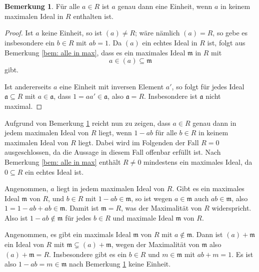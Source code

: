 \documentclass[a4paper,10pt]{article}
\newcounter{satze}
\theoremstyle{definition}
\newtheorem{bem}[satze]{Bemerkung}
\newcommand{\mf}[1]{\mathfrak{#1}}
\begin{document}
\section{}

\begin{bem}\label{bem: einheiten und maximale ideale}
 Für alle $a \in R$ ist $a$ genau dann eine Einheit, wenn $a$ in keinem maximalen Ideal in $R$ enthalten ist.
\end{bem}
\begin{proof}
 Ist $a$ keine Einheit, so ist $(a) \neq R$; wäre nämlich $(a) = R$, so gebe es insbesondere ein $b \in R$ mit $ab=1$. Da $(a)$ ein echtes Ideal in $R$ ist, folgt aus Bemerkung \ref{bem: alle in max}, dass es ein maximales Ideal $\mf{m}$ in $R$ mit
 \[
  a \in (a) \subseteq \mf{m}
 \]
 gibt.

 Ist andererseits $a$ eine Einheit mit inversen Element $a'$, so folgt für jedes Ideal $\mf{a} \subseteq R$ mit $a \in \mf{a}$, dass $1 = aa' \in \mf{a}$, also $\mf{a} = R$. Insbesondere ist $\mf{a}$ nicht maximal.
\end{proof}

Aufgrund von Bemerkung \ref{bem: einheiten und maximale ideale} reicht nun zu zeigen, dass $a \in R$ genau dann in jedem maximalen Ideal von $R$ liegt, wenn $1-ab$ für alle $b \in R$ in keinem maximalen Ideal von $R$ liegt. Dabei wird im Folgenden der Fall $R=0$ ausgeschlossen, da die Aussage in diesem Fall offenbar erfüllt ist. Nach Bemerkung \ref{bem: alle in max} enthält $R \neq 0$ mindestens ein maximales Ideal, da $0 \subseteq R$ ein echtes Ideal ist.

Angenommen, $a$ liegt in jedem maximalen Ideal von $R$. Gibt es ein maximales Ideal $\mf{m}$ von $R$, und $b \in R$ mit $1-ab \in \mf{m}$, so ist wegen $a \in \mf{m}$ auch $ab \in \mf{m}$, also $1 = 1-ab + ab \in \mf{m}$. Damit ist $\mf{m} = R$, was der Maximalität von $R$ widerspricht. Also ist $1-ab \not\in \mf{m}$ für jedes $b \in R$ und maximale Ideal $\mf{m}$ von $R$.

Angenommen, es gibt ein maximals Ideal $\mf{m}$ von $R$ mit $a \not\in \mf{m}$. Dann ist $(a) + \mf{m}$ ein Ideal von $R$ mit $\mf{m} \subsetneq (a) + \mf{m}$, wegen der Maximalität von $\mf{m}$ also $(a) + \mf{m} = R$. Insbesondere gibt es ein $b \in R$ und $m \in \mf{m}$ mit $ab+m = 1$. Es ist also $1-ab = m \in \mf{m}$ nach Bemerkung \ref{bem: einheiten und maximale ideale} keine Einheit.
\end{document}
